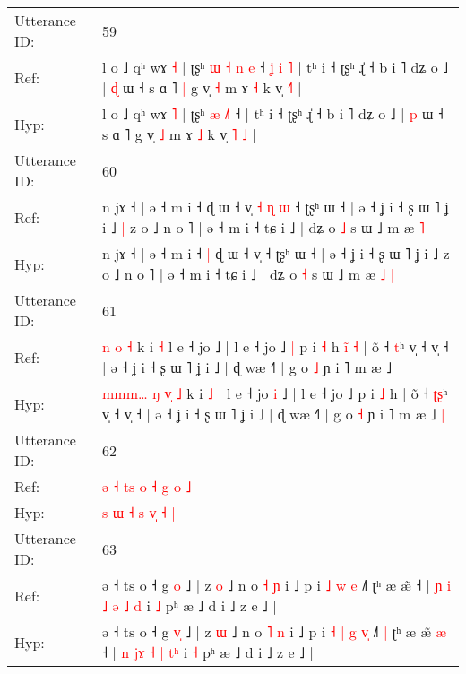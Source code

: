 \documentclass[10pt]{article}
\DeclareRobustCommand{\hl}[1]{{\textcolor{red}{#1}}}
\begin{document}
\begin{longtable}{ll}
 \\
\midrule
Utterance ID: & 59 \\
Ref: & l o ˩ qʰ wɤ \hl{˧} | ʈʂʰ\hl{ }\hl{ɯ} \hl{˧} \hl{n}\hl{ }\hl{e} ˧\hl{ }\hl{ʝ}\hl{ }\hl{i}\hl{ }\hl{˥} | tʰ i ˧ ʈʂʰ ɻ̍ ˧ b i ˥ dʑ o ˩ | \hl{ɖ} ɯ ˧ s ɑ ˥\hl{ }\hl{|} g v̩ \hl{˧} m ɤ \hl{˧} k v̩ \hl{}\hl{˧}\hl{˥} |
 \\
Hyp: & l o ˩ qʰ wɤ \hl{˥} | ʈʂʰ\hl{}\hl{} \hl{æ} \hl{}\hl{˩}\hl{˥} ˧\hl{}\hl{}\hl{}\hl{}\hl{}\hl{} | tʰ i ˧ ʈʂʰ ɻ̍ ˧ b i ˥ dʑ o ˩ | \hl{p} ɯ ˧ s ɑ ˥\hl{}\hl{} g v̩ \hl{˩} m ɤ \hl{˩} k v̩ \hl{˥}\hl{ }\hl{˩} |
 \\
\midrule
Utterance ID: & 60 \\
Ref: & n jɤ ˧ | ə ˧ m i ˧\hl{}\hl{} ɖ ɯ ˧ v̩\hl{ }\hl{˧}\hl{ }\hl{ɳ}\hl{ }\hl{ɯ} ˧ ʈʂʰ ɯ ˧ | ə ˧ ʝ i ˧ ʂ ɯ ˥ ʝ i ˩\hl{ }\hl{|} z o ˩ n o ˥ | ə ˧ m i ˧ tɕ i ˩ | dʑ o \hl{˩} s ɯ ˩ m æ\hl{}\hl{} \hl{˥}
 \\
Hyp: & n jɤ ˧ | ə ˧ m i ˧\hl{ }\hl{|} ɖ ɯ ˧ v̩\hl{}\hl{}\hl{}\hl{}\hl{}\hl{} ˧ ʈʂʰ ɯ ˧ | ə ˧ ʝ i ˧ ʂ ɯ ˥ ʝ i ˩\hl{}\hl{} z o ˩ n o ˥ | ə ˧ m i ˧ tɕ i ˩ | dʑ o \hl{˧} s ɯ ˩ m æ\hl{ }\hl{˩} \hl{|}
 \\
\midrule
Utterance ID: & 61 \\
Ref: & \hl{}\hl{}\hl{}\hl{}\hl{}\hl{n} \hl{}\hl{o} \hl{˧} k i\hl{}\hl{} \hl{˧} l e ˧ jo\hl{}\hl{} ˩ | l e ˧ jo ˩\hl{ }\hl{|} p i \hl{˧} h\hl{ }\hl{i}\hl{̃}\hl{ }\hl{˧} | õ ˧ \hl{}\hl{t}ʰ v̩ ˧ v̩ ˧ | ə ˧ ʝ i ˧ ʂ ɯ ˥ ʝ i ˩ | ɖ wæ ˧˥ | g o \hl{˩} ɲ i ˥ m æ ˩\hl{}\hl{}
 \\
Hyp: & \hl{m}\hl{m}\hl{m}\hl{…}\hl{ }\hl{ŋ} \hl{v}\hl{̩} \hl{˩} k i\hl{ }\hl{˩} \hl{|} l e ˧ jo\hl{ }\hl{i} ˩ | l e ˧ jo ˩\hl{}\hl{} p i \hl{˩} h\hl{}\hl{}\hl{}\hl{}\hl{} | õ ˧ \hl{ʈ}\hl{ʂ}ʰ v̩ ˧ v̩ ˧ | ə ˧ ʝ i ˧ ʂ ɯ ˥ ʝ i ˩ | ɖ wæ ˧˥ | g o \hl{˧} ɲ i ˥ m æ ˩\hl{ }\hl{|}
 \\
\midrule
Utterance ID: & 62 \\
Ref: & \hl{ə} \hl{˧} \hl{t}\hl{s} \hl{o} \hl{˧}\hl{ }\hl{g} \hl{o} \hl{˩}
 \\
Hyp: & \hl{s} \hl{ɯ} \hl{}\hl{˧} \hl{s} \hl{}\hl{v}\hl{̩} \hl{˧} \hl{|}
 \\
\midrule
Utterance ID: & 63 \\
Ref: & ə ˧ ts o ˧ g \hl{}\hl{o} ˩ | z \hl{o} ˩ n o \hl{˧} \hl{ɲ} i ˩ p i\hl{}\hl{} \hl{˩} \hl{w} \hl{}\hl{e} ˩˥\hl{}\hl{} ʈʰ æ æ̃\hl{}\hl{} ˧ | \hl{ɲ} \hl{}\hl{i} \hl{˩} \hl{ə} \hl{˩}\hl{ }\hl{d} i \hl{˩} pʰ æ ˩ d i ˩ z e ˩ |
 \\
Hyp: & ə ˧ ts o ˧ g \hl{v}\hl{̩} ˩ | z \hl{ɯ} ˩ n o \hl{˥} \hl{n} i ˩ p i\hl{ }\hl{˧} \hl{|} \hl{g} \hl{v}\hl{̩} ˩˥\hl{ }\hl{|} ʈʰ æ æ̃\hl{ }\hl{æ} ˧ | \hl{n} \hl{j}\hl{ɤ} \hl{˧} \hl{|} \hl{}\hl{t}\hl{ʰ} i \hl{˧} pʰ æ ˩ d i ˩ z e ˩ |

\end{longtable}
\end{document}
